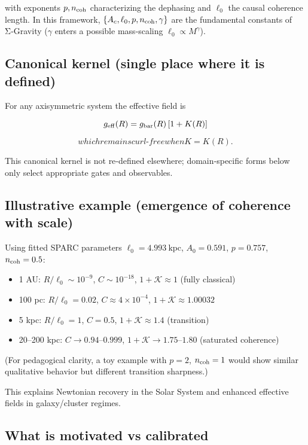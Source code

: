 \documentclass[11pt,a4paper]{article}
\begin{document}
with exponents $p,n_{\rm coh}$ characterizing the dephasing and $\ell_0$ the causal coherence length. In this framework, $\{A_c,\ell_0,p,n_{\rm coh},\gamma\}$ are the fundamental constants of Σ‑Gravity ($\gamma$ enters a possible mass‑scaling $\ell_0\propto M^{\gamma}$).


\subsection{Canonical kernel (single place where it is defined)}


For any axisymmetric system the effective field is


\begin{equation}
 g_{\rm eff}(R) = g_{\rm bar}(R)\,[1 + K(R)] 
\end{equation}


\[
which remains curl‑free when K = K(R).
\]


This canonical kernel is not re‑defined elsewhere; domain‑specific forms below only select appropriate gates and observables.


\subsection{Illustrative example (emergence of coherence with scale)}


Using fitted SPARC parameters $\ell_0=4.993~\mathrm{kpc}$, $A_0=0.591$, $p=0.757$, $n_{\rm coh}=0.5$:


\begin{itemize}
\item 1 AU: $R/\ell_0\sim10^{-9}$, $C\sim10^{-18}$, $1+\mathcal{K}\approx1$ (fully classical)
\item 100 pc: $R/\ell_0=0.02$, $C\approx4\times10^{-4}$, $1+\mathcal{K}\approx1.00032$
\item 5 kpc: $R/\ell_0=1$, $C=0.5$, $1+\mathcal{K}\approx1.4$ (transition)
\item 20–200 kpc: $C\to0.94\text{–}0.999$, $1+\mathcal{K}\to1.75\text{–}1.80$ (saturated coherence)
\end{itemize}


(For pedagogical clarity, a toy example with $p=2$, $n_{\rm coh}=1$ would show similar qualitative behavior but different transition sharpness.)


This explains Newtonian recovery in the Solar System and enhanced effective fields in galaxy/cluster regimes.


\subsection{What is motivated vs calibrated}
\end{document}

